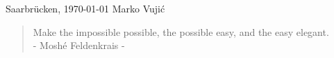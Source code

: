 \documentclass[11pt, a4paper, twoside]{Thesis}
\newcommand{\listofalgorithmes}{\tocfile{\listalgorithmcfname}{loa}}
\begin{document}
\begin{flushright}
\noindent Saarbr\"{u}cken, \today
\hfill
Marko Vuji\'c
\end{flushright}

\clearpage  %





\clearpage  %

\vspace*{\fill} 
\begin{quote} 
\centering 
Make the impossible possible, the possible easy, and the easy elegant.\\
 - Moshé Feldenkrais -
\end{quote}
\vspace*{\fill}



\thispagestyle{empty}

\begin{spacing}{0.1}
\pagestyle{fancy}
\tableofcontents
\listoffigures	
\listoftables
\end{spacing}
\clearpage

\mainmatter
\printglossary[type=\acronymtype]
%
%
%
%
%

%



%
%
%
%
%
%
%
%
%
%
%
%
%



{\small}
\clearpage

\appendix



%
\end{document}
